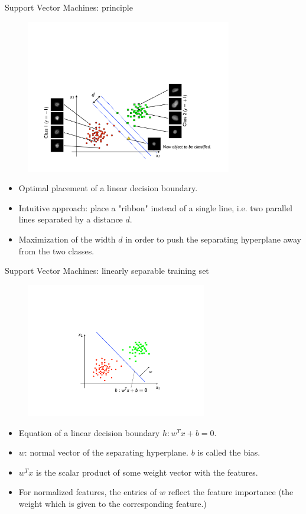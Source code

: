 \documentclass[xcolor=pdftex,dvipsnames,table]{beamer}
\begin{document}
\begin{frame}{Support Vector Machines: principle}
	\begin{figure}[htb]
		\includegraphics[width=0.8\textwidth]{../graphics/SVM1.pdf}
	\end{figure}
	\begin{itemize}
		\item Optimal placement of a linear decision boundary.
		\item Intuitive approach: place a "ribbon" instead of a single line, i.e. two parallel lines separated by a distance $d$.
		\item Maximization of the width $d$ in order to push the separating hyperplane away from the two classes.
	\end{itemize}
\end{frame}

\begin{frame}{Support Vector Machines: linearly separable training set}
	\begin{figure}[htb]
		\includegraphics[width=0.7\textwidth]{../graphics/SVM_1a.pdf}
	\end{figure}
	\begin{itemize}
		\item Equation of a linear decision boundary $h: w^Tx + b = 0$.
		\item $w$: normal vector of the separating hyperplane. $b$ is called the bias. 
		\item $w^Tx$ is the scalar product of some weight vector with the features. 
		\item For normalized features, the entries of $w$ reflect the feature importance (the weight which is given to the corresponding feature.)
	\end{itemize}
\end{frame}
\end{document}

